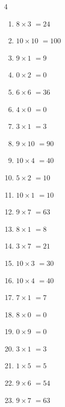 \begin{multicols}{4}
\begin{enumerate}
  \item $8\times 3$
        $=24$

  \item $10\times 10$
        $=100$

  \item $9\times 1$
        $=9$

  \item $0\times 2$
        $=0$

  \item $6\times 6$
        $=36$

  \item $4\times 0$
        $=0$

  \item $3\times 1$
        $=3$

  \item $9\times 10$
        $=90$

  \item $10\times 4$
        $=40$

  \item $5\times 2$
        $=10$

  \item $10\times 1$
        $=10$

  \item $9\times 7$
        $=63$

  \item $8\times 1$
        $=8$

\columnbreak %

  \item $3\times 7$
        $=21$

  \item $10\times 3$
        $=30$

  \item $10\times 4$
        $=40$

  \item $7\times 1$
        $=7$

  \item $8\times 0$
        $=0$

  \item $0\times 9$
        $=0$

  \item $3\times 1$
        $=3$

  \item $1\times 5$
        $=5$

  \item $9\times 6$
        $=54$

  \item $9\times 7$
        $=63$


\end{enumerate}
\end{multicols}

